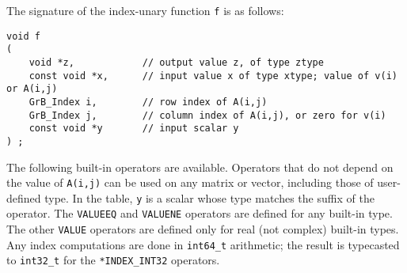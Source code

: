 \documentclass[12pt]{article}
\begin{document}
The signature of the index-unary function \verb'f' is as follows:

{\footnotesize
\begin{verbatim}
void f
(
    void *z,            // output value z, of type ztype
    const void *x,      // input value x of type xtype; value of v(i) or A(i,j)
    GrB_Index i,        // row index of A(i,j)
    GrB_Index j,        // column index of A(i,j), or zero for v(i)
    const void *y       // input scalar y
) ; \end{verbatim}}

The following built-in operators are available.  Operators that do not depend
on the value of \verb'A(i,j)' can be used on any matrix or vector, including
those of user-defined type.  In the table, \verb'y' is a
scalar whose type matches the suffix of the operator.  The \verb'VALUEEQ' and
\verb'VALUENE' operators are defined for any built-in type. The other
\verb'VALUE' operators are defined only for real (not complex) built-in types.
Any index computations are done in \verb'int64_t' arithmetic; the result is
typecasted to \verb'int32_t' for the \verb'*INDEX_INT32' operators.
\end{document}
